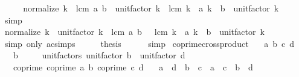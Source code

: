 \begin{isabellebody}
\ \ \isamarkupfalse%
\ \isamarkupfalse%
\ {\isachardoublequoteopen}normalize\ k\ {\isacharasterisk}{\kern0pt}\ lcm\ a\ b\ {\isacharasterisk}{\kern0pt}\ unit{\isacharunderscore}{\kern0pt}factor\ k\ {\isacharequal}{\kern0pt}\ lcm\ {\isacharparenleft}{\kern0pt}k\ {\isacharasterisk}{\kern0pt}\ a{\isacharparenright}{\kern0pt}\ {\isacharparenleft}{\kern0pt}k\ {\isacharasterisk}{\kern0pt}\ b{\isacharparenright}{\kern0pt}\ {\isacharasterisk}{\kern0pt}\ unit{\isacharunderscore}{\kern0pt}factor\ k{\isachardoublequoteclose}\isanewline
\ \ \ \ \isamarkupfalse%
\ simp\isanewline
\ \ \isamarkupfalse%
\ \isamarkupfalse%
\ {\isachardoublequoteopen}normalize\ k\ {\isacharasterisk}{\kern0pt}\ unit{\isacharunderscore}{\kern0pt}factor\ k\ {\isacharasterisk}{\kern0pt}\ lcm\ a\ b\ \ {\isacharequal}{\kern0pt}\ lcm\ {\isacharparenleft}{\kern0pt}k\ {\isacharasterisk}{\kern0pt}\ a{\isacharparenright}{\kern0pt}\ {\isacharparenleft}{\kern0pt}k\ {\isacharasterisk}{\kern0pt}\ b{\isacharparenright}{\kern0pt}\ {\isacharasterisk}{\kern0pt}\ unit{\isacharunderscore}{\kern0pt}factor\ k{\isachardoublequoteclose}\isanewline
\ \ \ \ \isamarkupfalse%
\ {\isacharparenleft}{\kern0pt}simp\ only{\isacharcolon}{\kern0pt}\ ac{\isacharunderscore}{\kern0pt}simps{\isacharparenright}{\kern0pt}\isanewline
\ \ \isamarkupfalse%
\ \isamarkupfalse%
\ {\isacharquery}{\kern0pt}thesis\isanewline
\ \ \ \ \isamarkupfalse%
\ simp\isanewline
{}\isamarkupfalse%
%
\endisatagproof
{\isafoldproof}%
%
\isadelimproof
\isanewline
%
\endisadelimproof
\isanewline
{}\isamarkupfalse%
\ coprime{\isacharunderscore}{\kern0pt}crossproduct{\isacharprime}{\kern0pt}{\isacharcolon}{\kern0pt}\isanewline
\ \ \ a\ b\ c\ d\isanewline
\ \ \ {\isachardoublequoteopen}b\ {\isasymnoteq}\ {}{\isachardoublequoteclose}\isanewline
\ \ \ unit{\isacharunderscore}{\kern0pt}factors{\isacharcolon}{\kern0pt}\ {\isachardoublequoteopen}unit{\isacharunderscore}{\kern0pt}factor\ b\ {\isacharequal}{\kern0pt}\ unit{\isacharunderscore}{\kern0pt}factor\ d{\isachardoublequoteclose}\isanewline
\ \ \ coprime{\isacharcolon}{\kern0pt}\ {\isachardoublequoteopen}coprime\ a\ b{\isachardoublequoteclose}\ {\isachardoublequoteopen}coprime\ c\ d{\isachardoublequoteclose}\isanewline
\ \ \ {\isachardoublequoteopen}a\ {\isacharasterisk}{\kern0pt}\ d\ {\isacharequal}{\kern0pt}\ b\ {\isacharasterisk}{\kern0pt}\ c\ {\isasymlongleftrightarrow}\ a\ {\isacharequal}{\kern0pt}\ c\ {\isasymand}\ b\ {\isacharequal}{\kern0pt}\ d{\isachardoublequoteclose}\isanewline

\end{isabellebody}
